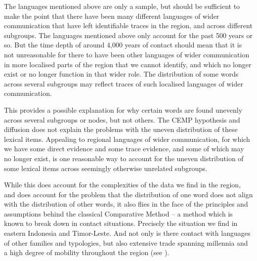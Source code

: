 The languages mentioned above are only a sample,
but should be sufficient to make the point that there have been
many different languages of wider communication that have left
identifiable traces in the region,
and across different subgroups.
The languages mentioned above only account for the past 500 years or so.
But the time depth of around 4,000 years of contact should mean
that it is not unreasonable for there to have been other languages
of wider communication in more localised parts of the region
that we cannot identify,
and which no longer exist or no longer function in that wider role.
The distribution of some words across several subgroups may reflect
traces of such localised languages of wider communication.

This provides a possible explanation for why certain words are
found unevenly across several subgroups or nodes, but not others.
The CEMP hypothesis and diffusion does not explain the problems
with the uneven distribution of these lexical items.
Appealing to regional languages of wider communication,
for which we have some direct evidence
and some trace evidence,
and some of which may no longer exist,
is one reasonable way to account for the uneven distribution
of some lexical items across seemingly otherwise unrelated subgroups.

\newpage
While this does account for the complexities of the data we find
in the region, and does account for the problem that the distribution of one
word does not align with the distribution of other words,
it also flies in the face of the principles
and assumptions behind the classical Comparative Method -- a method
which is known to break down in contact situations.
Precisely the situation we find in eastern Indonesia and Timor-Leste.
And not only is there contact with languages of other families
and typologies, but also extensive trade spanning millennia
and a high degree of mobility throughout the region (see ).

